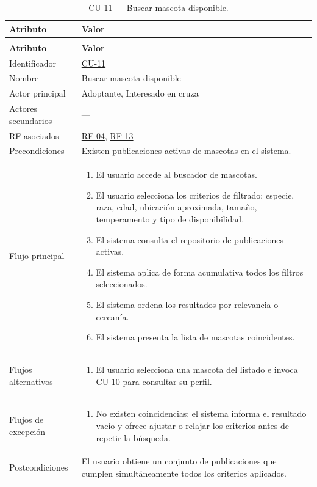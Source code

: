 \documentclass[journal,onecolumn]{IEEEtran}
\makeatletter
\newenvironment{atributos}[2]{%
	\small
	\begin{longtable}{@{}>{\raggedright\arraybackslash}p{4.2cm} >{\raggedright\arraybackslash}p{11.2cm}@{}}
		\caption{#2}\label{tab:#1}\\
		\toprule
		\textbf{Atributo} & \textbf{Valor} \\
		\midrule
		\endfirsthead
		\multicolumn{2}{@{}l}{\small\itshape (continuación)}\\
		\toprule
		\textbf{Atributo} & \textbf{Valor} \\
		\midrule
		\endhead
		\bottomrule
		\endlastfoot
	}{%
	\end{longtable}
	\normalsize
}
\makeatother
\begin{document}
	\begin{atributos}{CU-11}{CU-11 --- Buscar mascota disponible.}
		Identificador & \hyperref[tab:CU-11]{CU-11} \\
		Nombre & Buscar mascota disponible \\
		Actor principal & Adoptante, Interesado en cruza \\
		Actores secundarios & --- \\
		RF asociados & \hyperref[tab:RF-04]{RF-04}, \hyperref[tab:RF-13]{RF-13} \\
		Precondiciones & Existen publicaciones activas de mascotas en el sistema. \\
		Flujo principal &
		\begin{enumerate}[leftmargin=*, nosep]
			\item El usuario accede al buscador de mascotas.
			\item El usuario selecciona los criterios de filtrado: especie, raza, edad, ubicación aproximada, tamaño, temperamento y tipo de disponibilidad.
			\item El sistema consulta el repositorio de publicaciones activas.
			\item El sistema aplica de forma acumulativa todos los filtros seleccionados.
			\item El sistema ordena los resultados por relevancia o cercanía.
			\item El sistema presenta la lista de mascotas coincidentes.
		\end{enumerate} \\
		Flujos alternativos &
		\begin{enumerate}[leftmargin=*, nosep]
			\item[6.1] El usuario selecciona una mascota del listado e invoca \hyperref[tab:CU-10]{CU-10} para consultar su perfil.
		\end{enumerate} \\
		Flujos de excepción &
		\begin{enumerate}[leftmargin=*, nosep]
			\item[5.1] No existen coincidencias: el sistema informa el resultado vacío y ofrece ajustar o relajar los criterios antes de repetir la búsqueda.
		\end{enumerate} \\
		Postcondiciones & El usuario obtiene un conjunto de publicaciones que cumplen simultáneamente todos los criterios aplicados. \\
	\end{atributos}
	
\end{document}
